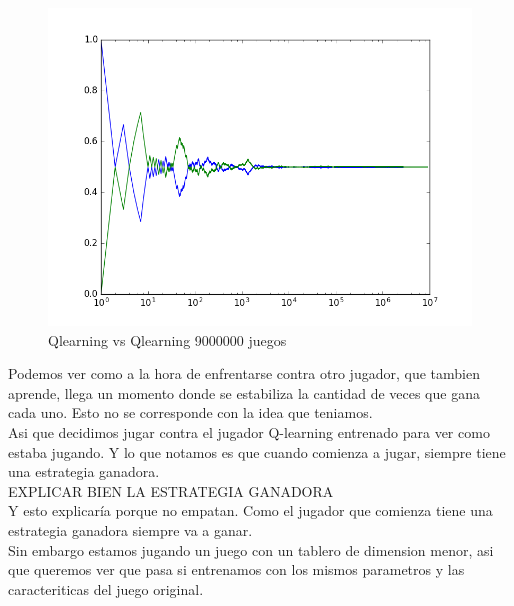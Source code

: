 \begin{figure}[h]
 \centering
 \begin{minipage}{.45\textwidth}	  
	\centering	
	\includegraphics[scale=0.35]{img/QlearningQlearningEgreedy9000000.png}
        \caption{Qlearning vs Qlearning 9000000 juegos}
  \end{minipage}
\end{figure}


Podemos ver como a la hora de enfrentarse contra otro jugador, que tambien aprende, llega un momento donde se estabiliza la cantidad de veces que gana cada uno. Esto no se corresponde con la idea que teniamos. \\

Asi que decidimos jugar contra el jugador Q-learning entrenado para ver como estaba jugando. Y lo que notamos es que cuando comienza a jugar, siempre tiene una estrategia ganadora.\\
{\huge EXPLICAR BIEN LA ESTRATEGIA GANADORA}\\

Y esto explicaría porque no empatan. Como el jugador que comienza tiene una estrategia ganadora siempre va a ganar.\\


Sin embargo estamos jugando un juego con un tablero de dimension menor, asi que queremos ver que pasa si entrenamos con los mismos parametros y las caracteriticas del juego original.

